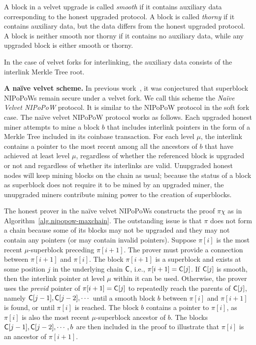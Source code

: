 \begin{definition}
A block in a velvet upgrade is called \emph{smooth} if it contains
auxiliary data corresponding to the honest upgraded protocol. A block
is called \emph{thorny} if it contains auxiliary data, but the data differs from
the honest upgraded protocol. A block is neither smooth nor thorny if it
contains no auxiliary data, while any upgraded block is either smooth or thorny.
\end{definition}

In the case of velvet forks for interlinking, the auxiliary data consists
of the interlink Merkle Tree root.

\noindent
\textbf{A na\"ive velvet scheme.}
In previous work~\cite{nipopows}, it was conjectured that superblock NIPoPoWs
remain secure under a velvet fork. We call this scheme the \emph{Na\"ive Velvet
NIPoPoW} protocol. It is similar to the NIPoPoW protocol in the
soft fork case. The na\"ive velvet NIPoPoW protocol works as follows.
Each upgraded honest miner attempts to mine a block $b$
that includes interlink pointers in the form of a Merkle Tree included in its
coinbase transaction. For each level $\mu$, the interlink contains a pointer to
the most recent among all the ancestors of $b$ that have achieved at least
level $\mu$, regardless of whether the referenced block is upgraded or not and
regardless of whether its interlinks are valid. Unupgraded honest nodes will
keep mining blocks on the chain as usual; because the status of a block as
superblock does not require it to be mined by an upgraded miner, the unupgraded
miners contribute mining power to the creation of superblocks.

The  honest prover in the na\"ive velvet NIPoPoWs constructs the proof $\pi \chi$ as in Algorithm~\ref{alg.nipopow-maxchain}.
The outstanding issue is that
$\pi$ does not form a chain because some of
its blocks may not be upgraded and they may not contain any pointers (or may
contain invalid pointers).
Suppose $\pi[i]$ is the most recent $\mu$-superblock preceding $\pi[i + 1]$.
The prover must provide a connection between $\pi[i + 1]$ and $\pi[i]$.
The block $\pi[i + 1]$ is a superblock and exists at some position $j$ in the
underlying chain $\mathsf{C}$, i.e., $\pi[i + 1] = \mathsf{C}[j]$. If
$\mathsf{C}[j]$ is smooth, then the interlink pointer at level $\mu$ within
it can be used. Otherwise, the prover uses the \emph{previd} pointer of
$\pi[i + 1] = \mathsf{C}[j]$ to repeatedly reach the parents of $\mathsf{C}[j]$, namely
$\mathsf{C}[j - 1], \mathsf{C}[j - 2], \cdots$ until a smooth block $b$ between $\pi[i]$
and $\pi[i + 1]$ is found, or until $\pi[i]$ is reached.
The block $b$ contains a pointer to
$\pi[i]$, as $\pi[i]$ is also the most recent $\mu$-superblock ancestor of $b$.
The blocks $\mathsf{C}[j - 1], \mathsf{C}[j - 2], \cdots, b$ are then included in the
proof to illustrate that $\pi[i]$ is an ancestor of $\pi[i + 1]$.

